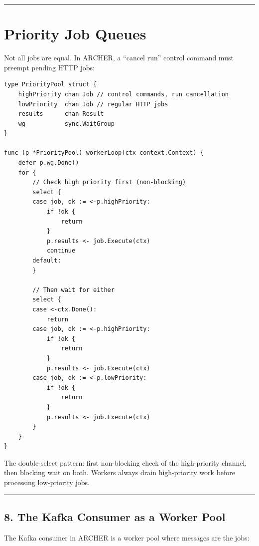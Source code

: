 \documentclass[11pt,a4paper,oneside]{book}
\begin{document}
\begin{center}\rule{0.5\linewidth}{0.5pt}\end{center}

\section{Priority Job Queues}

Not all jobs are equal. In ARCHER, a ``cancel run'' control command must
preempt pending HTTP jobs:

\begin{verbatim}
type PriorityPool struct {
    highPriority chan Job // control commands, run cancellation
    lowPriority  chan Job // regular HTTP jobs
    results      chan Result
    wg           sync.WaitGroup
}

func (p *PriorityPool) workerLoop(ctx context.Context) {
    defer p.wg.Done()
    for {
        // Check high priority first (non-blocking)
        select {
        case job, ok := <-p.highPriority:
            if !ok {
                return
            }
            p.results <- job.Execute(ctx)
            continue
        default:
        }

        // Then wait for either
        select {
        case <-ctx.Done():
            return
        case job, ok := <-p.highPriority:
            if !ok {
                return
            }
            p.results <- job.Execute(ctx)
        case job, ok := <-p.lowPriority:
            if !ok {
                return
            }
            p.results <- job.Execute(ctx)
        }
    }
}
\end{verbatim}

The double-select pattern: first non-blocking check of the high-priority
channel, then blocking wait on both. Workers always drain high-priority
work before processing low-priority jobs.

\begin{center}\rule{0.5\linewidth}{0.5pt}\end{center}

\subsection{8. The Kafka Consumer as a Worker
Pool}

The Kafka consumer in ARCHER is a worker pool where messages are the
jobs:
\end{document}
